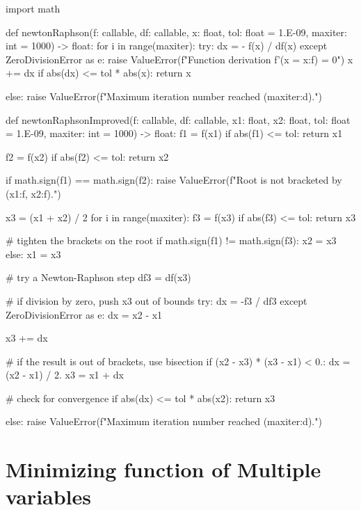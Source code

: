 \begin{python}
import math

def newtonRaphson(f: callable, df: callable, x: float,
                  tol: float = 1.E-09, maxiter: int = 1000) -> float:
    for i in range(maxiter):
        try:
            dx = - f(x) / df(x)
        except ZeroDivisionError as e:
            raise ValueError(f"Function derivation  f'(x = {x:f}) = 0")
        x += dx
        if abs(dx) <= tol * abs(x):
            return x

    else:
        raise ValueError(f"Maximum iteration number reached ({maxiter:d}).")

def newtonRaphsonImproved(f: callable, df: callable, x1: float, x2: float,
                          tol: float = 1.E-09, maxiter: int = 1000) -> float:
    f1 = f(x1)
    if abs(f1) <= tol:
        return x1

    f2 = f(x2)
    if abs(f2) <= tol:
        return x2

    if math.sign(f1) == math.sign(f2):
        raise ValueError(f"Root is not bracketed by ({x1:f}, {x2:f}).")

    x3 = (x1 + x2) / 2
    for i in range(maxiter):
        f3 = f(x3)
        if abs(f3) <= tol:
            return x3

        # tighten the brackets on the root
        if math.sign(f1) != math.sign(f3):
            x2 = x3
        else:
            x1 = x3

        # try a Newton-Raphson step
        df3 = df(x3)

        # if division by zero, push x3 out of bounds
        try:
            dx = -f3 / df3
        except ZeroDivisionError as e:
            dx = x2 - x1

        x3 += dx

        # if the result is out of brackets, use bisection
        if (x2 - x3) * (x3 - x1) < 0.:
            dx = (x2 - x1) / 2.
            x3 = x1 + dx

        # check for convergence
        if abs(dx) <= tol * abs(x2):
            return x3

    else:
        raise ValueError(f"Maximum iteration number reached ({maxiter:d}).")

\end{python}


\newpage
\section{Minimizing function of Multiple variables}


